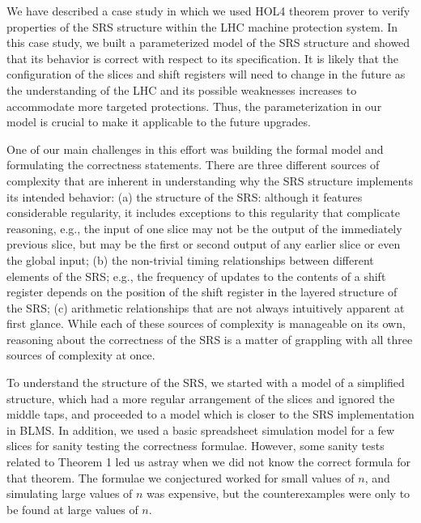 \documentclass{llncs}
\begin{document}
We have described a case study in which we used HOL4 theorem prover to verify properties of the SRS structure within the LHC machine protection system.
In this case study, we built a parameterized model of the SRS structure and showed that its behavior is correct with respect to its specification.
It is likely that the configuration of the slices and shift registers will need to change in the future as the understanding of the LHC and its possible weaknesses increases to accommodate more targeted protections.
Thus, the parameterization in our model is crucial to make it applicable to the future upgrades.

One of our main challenges in this effort was building the formal model and formulating the correctness statements.
There are three different sources of complexity that are inherent in understanding why the SRS structure implements its intended behavior:
(a) the structure of the SRS: although it features considerable regularity, it includes exceptions to this regularity that complicate reasoning, e.g., the input of one slice may not be the output of the immediately previous slice, but may be the first or second output of any earlier slice or even the global input;
(b) the non-trivial timing relationships between different elements of the SRS; e.g., the frequency of updates to the contents of a shift register depends on the position of the shift register in the layered structure of the SRS;
(c) arithmetic relationships that are not always intuitively apparent at first glance.
While each of these sources of complexity is manageable on its own, reasoning about the correctness of the SRS is a matter of grappling with all three sources of complexity at once.

To understand the structure of the SRS, we started with a model of a simplified structure, which had a more regular arrangement of the slices and ignored the middle taps, and proceeded to a model which is closer to the SRS implementation in BLMS.
In addition, we used a basic spreadsheet simulation model for a few slices for sanity testing the correctness formulae.
However, some sanity tests related to Theorem 1 led us astray when we did not know the correct formula for that theorem.
The formulae we conjectured worked for small values of $n$, and simulating large values of $n$ was expensive, but the counterexamples were only to be found at large values of $n$.
\end{document}
